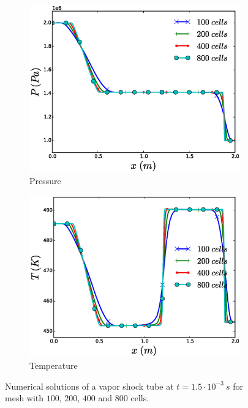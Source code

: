 \documentclass{inputs/mc2015}
\begin{document}
\begin{figure}[H]
        \begin{subfigure}[b]{0.495\textwidth}
                \centering
                \includegraphics[width=\textwidth]{figures/vapor-mesh-sensitivity-pressure-plot.eps}
                \caption{Pressure}
                \label{fig:vapor-tube-plots-press}
        \end{subfigure}        
        \begin{subfigure}[b]{0.495\textwidth}
                \centering
                \includegraphics[width=\textwidth]{figures/vapor-mesh-sensitivity-temperature-plot.eps}
                \caption{Temperature}
                \label{fig:vapor-tube-plots-temp}
        \end{subfigure}
        \caption{Numerical solutions of a vapor shock tube at $t=1.5 \cdot 10^{-3} \ s$ for mesh with $100$, $200$, $400$ and $800$ cells.}\label{fig:vapor-tube-plots}
\end{figure}
\end{document}
